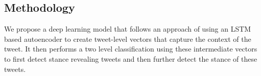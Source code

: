 \documentclass[a0,portrait]{a0poster}
\begin{document}
\begin{multicols}{2}

\section*{Methodology}
We propose a deep learning model that follows an approach of using an LSTM based autoencoder to create tweet-level vectors that capture the context of the tweet. It then performs a two level classification using these intermediate vectors to first detect stance revealing tweets and then further detect the stance of these tweets.


\end{multicols}
\end{document}
